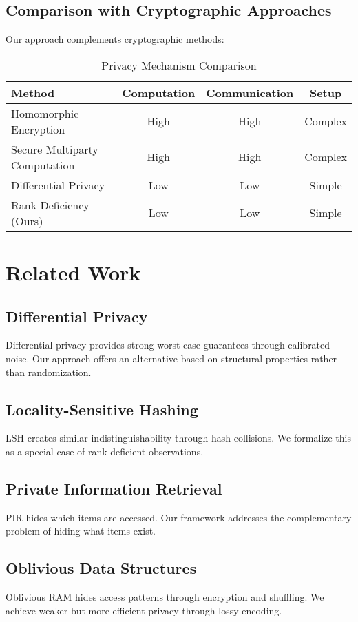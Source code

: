 \documentclass[11pt]{article}
\begin{document}
\subsection{Comparison with Cryptographic Approaches}

Our approach complements cryptographic methods:

\begin{table}[h]
\centering
\caption{Privacy Mechanism Comparison}
\begin{tabular}{lccc}
\toprule
Method & Computation & Communication & Setup \\
\midrule
Homomorphic Encryption & High & High & Complex \\
Secure Multiparty Computation & High & High & Complex \\
Differential Privacy & Low & Low & Simple \\
Rank Deficiency (Ours) & Low & Low & Simple \\
\bottomrule
\end{tabular}
\end{table}

\section{Related Work}

\subsection{Differential Privacy}
Differential privacy \cite{dwork2006,mcsherry2007} provides strong worst-case guarantees through calibrated noise. Our approach offers an alternative based on structural properties rather than randomization.

\subsection{Locality-Sensitive Hashing}
LSH \cite{indyk1998} creates similar indistinguishability through hash collisions. We formalize this as a special case of rank-deficient observations.

\subsection{Private Information Retrieval}
PIR \cite{chor1995} hides which items are accessed. Our framework addresses the complementary problem of hiding what items exist.

\subsection{Oblivious Data Structures}
Oblivious RAM \cite{goldreich1996} hides access patterns through encryption and shuffling. We achieve weaker but more efficient privacy through lossy encoding.
\end{document}
